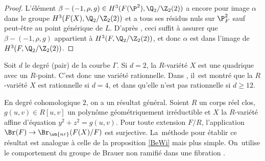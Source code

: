 \begin{proof}
L'élément $\beta - (-1,\rho, g) \in H^3(F(\P^2),\Q_2/\Z_2(2))$ a encore pour image $\alpha$
dans le groupe $H^3(F(X),\Q_2/\Z_2(2))$ et a tous ses résidus nuls sur $\P^2_{F}$
sauf peut-être au point générique de $L$. D'après \cite[Prop.\,8.6, Rem.\,1.11, Rem.\,2.5]{rost1996chow}, ceci suffit à assurer
que $\beta - (-1,\rho, g)$ appartient à $H^3(F,\Q_2/\Z_2(2))$, et donc
$\alpha$ est dans l'image de $H^3(F,\Q_2/\Z_2(2))$.
\end{proof}

\begin{rmk}
Soit $d$ le degré (pair) de la courbe $\Gamma$. Si $d=2$, la $R$-variété $X$ est une quadrique avec un $R$-point. C'est donc une variété rationnelle. Dans \cite[Th.\,2.2]{benoist2026rationality}, il~est montré que la $R$-variété $X$
est rationnelle si $d=4$, et dans \cite[Th.\,4.5]{benoist2026rationality} qu'elle n'est pas rationnelle si $d\geq 12$.
\end{rmk}

\begin{rmk} En degré cohomologique $2$, on a un résultat général.
Soient $R$ un corps réel clos, $g(u,v) \in R[u,v]$ un polynôme
géométriquement irréductible et $X$ la $R$-variété affine d'équation $y^2+z^2=g(u,v)$. Pour toute extension $F/R$, l'application $\Br(F) \to \Br_{\on{nr}}(F(X)/F)$ est surjective. La~méthode pour établir ce résultat est analogue à celle de la proposition \ref{BeWi} mais plus simple. On~utilise le comportement du groupe de Brauer non ramifié dans une fibration \cite[Ch.\,11]{colliot2021brauer}.
\end{rmk}

